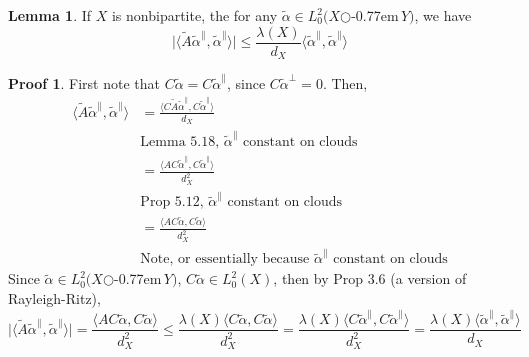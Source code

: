 \documentclass{book}
\newcommand{\zigzag}{$\bigcirc$\kern-0.77em\raisebox{-.16ex}{\small Z}$\,$}
\newcommand{\inner}[1]{\langle #1 \rangle}
\newcommand{\abs}[1]{\lvert #1 \rvert }
\theoremstyle{definition}
\newtheorem{lemma}{Lemma}[chapter]
\theoremstyle{remarkstyle}
\newtheorem*{myproof}{Proof}%
\begin{document}
\begin{lemma}
    If $X$ is nonbipartite, the for any $\tilde{\alpha}\in L^{2}_{0}(X$\zigzag$Y)$, we have 
    $$
    \abs{\inner{\tilde{A}\tilde{\alpha}^{\parallel},\tilde{\alpha}^{\parallel}}} \le \frac{\lambda(X)}{d_X}\inner{\tilde{\alpha}^{\parallel},\tilde{\alpha}^{\parallel}}
    $$
\end{lemma}
\begin{myproof}
    First note that $C\tilde{\alpha}=C\tilde{\alpha}^{\parallel}$, since $C\tilde{\alpha}^{\perp}=0 $. Then, 
    \begin{align*}
        \inner{\tilde{A}\tilde{\alpha}^{\parallel},\tilde{\alpha}^{\parallel}} 
        &= \frac{\inner{C\tilde{A}\tilde{\alpha}^{\parallel},C\tilde{\alpha}^{\parallel}}}{d_X} \\ 
        &\textrm{Lemma 5.18, $\tilde{\alpha}^{\parallel}$ constant on clouds} \\
        &= \frac{\inner{AC\tilde{\alpha}^{\parallel},C\tilde{\alpha}^{\parallel}}}{d^2_X} \\ 
        &\textrm{Prop 5.12, $\tilde{\alpha}^{\parallel}$ constant on clouds} \\
        &= \frac{\inner{AC\tilde{\alpha},C\tilde{\alpha}}}{d^2_X} \\ 
        &\textrm{Note, or essentially because $\tilde{\alpha}^{\parallel}$ constant on clouds}
    \end{align*} 
    Since $\tilde{\alpha}\in L^{2}_{0}(X$\zigzag$Y)$, $C\tilde{\alpha}\in L^2_0(X)$, then by Prop 3.6 (a version of Rayleigh-Ritz), 
    $$
    \abs{\inner{\tilde{A}\tilde{\alpha}^{\parallel},\tilde{\alpha}^{\parallel}}} = \frac{\inner{AC\tilde{\alpha},C\tilde{\alpha}}}{d^2_X} \le \frac{\lambda(X)\inner{C\tilde{\alpha},C\tilde{\alpha}}}{d^2_X} = \frac{\lambda(X)\inner{C\tilde{\alpha}^{\parallel},C\tilde{\alpha}^{\parallel} }}{d^2_X} = \frac{\lambda(X)\inner{\tilde{\alpha}^{\parallel},\tilde{\alpha}^{\parallel} }}{d_X}
    $$
    \newline
\end{myproof}
\end{document}

